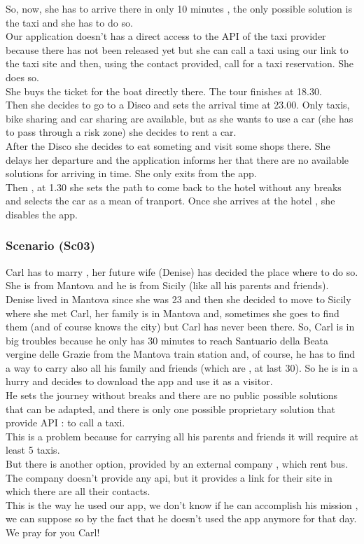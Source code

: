 \documentclass[a4paper,leqno]{book}
\begin{document}
So, now, she has to arrive there in only 10 minutes , the only possible solution is the taxi and she has to do so.\\
Our application doesn't has a direct access to the API of the taxi provider because there has not been released yet but she can call a taxi using our link to the taxi site and then, using the contact provided, call for a taxi reservation. She does so.\\
She buys the ticket for the boat directly there. 
The tour finishes at 18.30.\\
Then she decides to go to a Disco and sets the arrival time at 23.00.
Only taxis, bike sharing and car sharing are available, but as she wants to use a car (she has to pass through a risk zone) she decides to rent a car.\\
After the Disco she decides to eat someting and visit some shops there. 
She delays her departure and the application informs her that there are no available solutions for arriving in time. She only exits from the app.\\
Then , at 1.30 she sets the path to come back to the hotel without any breaks and selects the car as a mean of tranport. Once she arrives at the hotel , she disables the app.\\

\subsubsection{Scenario (Sc03) }
Carl has to marry , her future wife (Denise) has decided the place where to do so.\\
She is from Mantova and he is from Sicily (like all his parents and friends).\\
Denise lived in Mantova since she was 23 and then she decided to move to Sicily where she met Carl, her family is in Mantova and, sometimes she goes to find them (and of course knows the city) but Carl has never been there.
So, Carl is in big troubles because he only has 30 minutes to reach Santuario della Beata vergine delle Grazie from the Mantova train station and, of course, he has to find a way to carry also all his family and friends (which are , at last 30).
So he is in a hurry and decides to download the app and use it as a visitor.\\
He sets the journey without breaks and there are no public possible solutions that can be adapted, and there is only one possible proprietary solution that provide API : to call a taxi.\\
This is a problem because for carrying all his parents and friends it will require at least 5 taxis.\\
But there is another option, provided by an external company , which rent bus.\\
The company doesn't provide any api, but it provides a link for their site in which there are all their contacts.\\
This is the way he used our app, we don't know if he can accomplish his mission , we can suppose so by the fact that he doesn't used the app anymore for that day.\\
We pray for you Carl!\\
\end{document}
